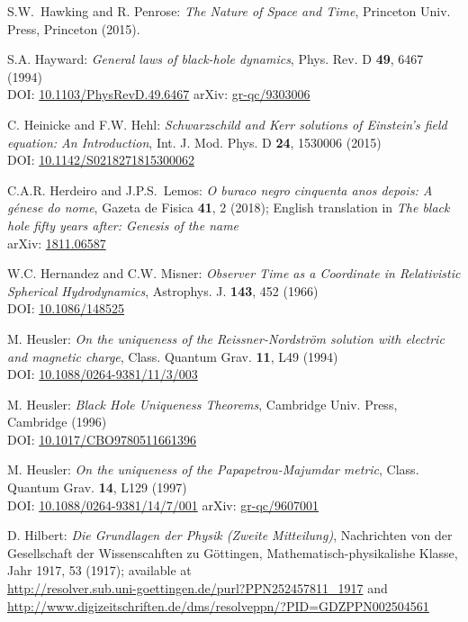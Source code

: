 \begin{thebibliography}{123}
S.W.~Hawking and R. Penrose: {\em The Nature of Space and Time},
Princeton Univ. Press, Princeton (2015).

S.A. Hayward:
{\em General laws of black-hole dynamics},
Phys. Rev. D {\bf 49}, 6467 (1994)\\
DOI: \href{https://doi.org/10.1103/PhysRevD.49.6467}{10.1103/PhysRevD.49.6467}\hfill
arXiv: \href{https://arxiv.org/abs/gr-qc/9303006}{gr-qc/9303006}

C. Heinicke and F.W. Hehl:
{\em Schwarzschild and Kerr solutions of Einstein's field equation: An Introduction},
Int. J. Mod. Phys. D {\bf 24}, 1530006 (2015)\\
DOI: \href{https://doi.org/10.1142/S0218271815300062}{10.1142/S0218271815300062}

C.A.R. Herdeiro and J.P.S.~Lemos:
\emph{O buraco negro cinquenta anos depois:
A génese do nome},
Gazeta de Fisica {\bf 41}, 2 (2018); English translation in
\emph{The black hole fifty years after: Genesis of the name}\\
arXiv: \href{https://arxiv.org/abs/1811.06587}{1811.06587}

W.C. Hernandez and C.W. Misner:
{\em Observer Time as a Coordinate in Relativistic Spherical Hydrodynamics},
Astrophys. J. {\bf 143}, 452 (1966) \\
DOI: \href{https://doi.org/10.1086/148525}{10.1086/148525}

M. Heusler:
{\em On the uniqueness of the Reissner-Nordström solution with electric and magnetic charge},
Class. Quantum Grav. {\bf 11}, L49 (1994)\\
DOI: \href{https://doi.org/10.1088/0264-9381/11/3/003}{10.1088/0264-9381/11/3/003}

M. Heusler:
{\em Black Hole Uniqueness Theorems},
Cambridge Univ. Press, Cambridge (1996) \\
DOI: \href{https://doi.org/10.1017/CBO9780511661396}{10.1017/CBO9780511661396}

M. Heusler:
{\em On the uniqueness of the Papapetrou-Majumdar metric},
Class. Quantum Grav. {\bf 14}, L129 (1997)\\
DOI: \href{https://doi.org/10.1088/0264-9381/14/7/001}{10.1088/0264-9381/14/7/001}\hfill
arXiv: \href{https://arxiv.org/abs/gr-qc/9607001}{gr-qc/9607001}

D. Hilbert:
{\em Die Grundlagen der Physik (Zweite Mitteilung)},
Nachrichten von der Gesellschaft der Wissenscahften zu Göttingen,
Mathematisch-physikalishe Klasse, Jahr 1917, 53 (1917);
available at\\
\url{http://resolver.sub.uni-goettingen.de/purl?PPN252457811_1917} and\\
\url{http://www.digizeitschriften.de/dms/resolveppn/?PID=GDZPPN002504561}


\end{thebibliography}
